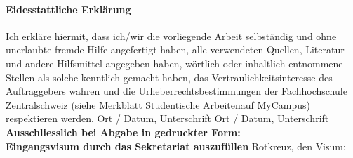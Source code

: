 \paragraph{\textbf{Eidesstattliche Erkl\"arung}}
Ich erkl\"are hiermit, dass ich/wir die vorliegende Arbeit selbst\"andig und ohne unerlaubte fremde Hilfe angefertigt haben, alle verwendeten Quellen, Literatur und andere Hilfsmittel angegeben haben, w\"ortlich oder inhaltlich entnommene Stellen als solche kenntlich gemacht haben, das Vertraulichkeitsinteresse des Auftraggebers wahren und die Urheberrechtsbestimmungen der Fachhochschule Zentralschweiz (siehe Merkblatt \glqq Studentische Arbeiten\grqq auf MyCampus) respektieren werden. \newline \newline
Ort / Datum, Unterschrift \hspace*{3cm}	\newline \newline
Ort / Datum, Unterschrift	\underline{\hspace*{8cm}} \newline \newline \newline
\textbf{Ausschliesslich bei Abgabe in gedruckter Form: \\
Eingangsvisum durch das Sekretariat auszuf\"ullen}\newline \newline
Rotkreuz, den	\underline{\hspace*{4cm}}	\hspace*{1cm} Visum:	\underline{\hspace*{4cm}}
\newpage